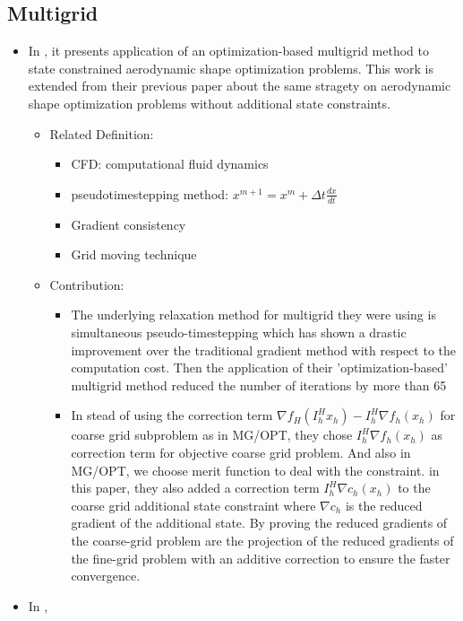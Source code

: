 \documentclass{article}
\begin{document}
\subsection{Multigrid}
\begin{itemize}
\item In  \cite{M1}, it presents application of an optimization-based multigrid method to state constrained aerodynamic shape optimization problems. This work is extended from their previous paper \cite{SB2} about the same stragety on aerodynamic shape optimization problems without additional state constraints. 
\begin{itemize}
\item Related Definition:
\begin{itemize}
\item CFD: computational fluid dynamics
\item pseudotimestepping method: $x^{m+1}=x^m+\Delta t \frac{dx}{dt}$
\item Gradient consistency
\item Grid moving technique
\end{itemize}
\item Contribution:
\begin{itemize}
\item The underlying relaxation method for multigrid they were using is simultaneous pseudo-timestepping which has shown a drastic improvement over the traditional gradient method with respect to the computation cost. Then the application of their 'optimization-based' multigrid method reduced the number of iterations by more than 65%
\item In stead of using the correction term $\nabla f_H(I_h^{H}x_h)-I_h^H \nabla f_h(x_h)$ for coarse grid subproblem as in MG/OPT, they chose $I_h^{H}\nabla f_h(x_h)$ as correction term for objective coarse grid problem. And also in MG/OPT, we choose merit function to deal with the constraint. in this paper, they also added a correction term $I_h^{H}\nabla c_h(x_h)$ to the coarse grid additional state constraint where $\nabla c_h$ is the reduced gradient of the additional state. By proving the reduced gradients of the coarse-grid problem are the projection of the reduced gradients of the fine-grid problem with an additive correction to ensure the faster convergence. 
\end{itemize}
\end{itemize}

\item In \cite{DIA}, 


\end{itemize}
\end{document}

